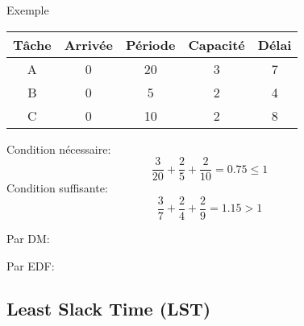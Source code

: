 \begin{frame}{Exemple}
  \begin{center}
    \begin{tabular}{ccccc}
      \hline
      Tâche & Arrivée & Période & Capacité & Délai \\
      \hline
      A & 0 & 20 & 3 & 7\\
      B & 0 &  5 & 2 & 4\\
      C & 0 & 10 & 2 & 8\\
      \hline
    \end{tabular}
  \end{center}
  \begin{overprint}

    Condition nécessaire:
    $$\frac{3}{20} + \frac{2}{5} + \frac{2}{10} = 0.75 ≤ 1$$
    Condition suffisante:
    $$\frac{3}{7} + \frac{2}{4} + \frac{2}{9} = 1.15 > 1$$

    Par DM:
    \begin{center}
      
    \end{center}

    Par EDF:
    \begin{center}
      
    \end{center}
  \end{overprint}
\end{frame}

\subsection{Least Slack Time (LST)}

